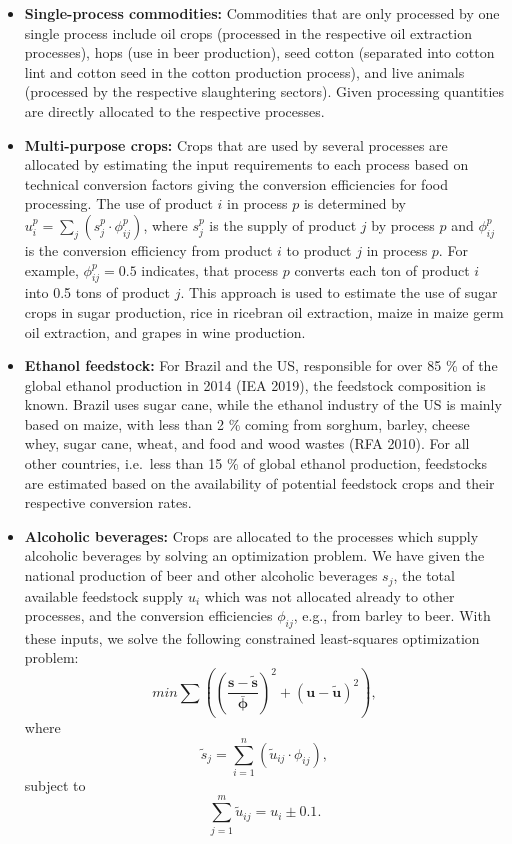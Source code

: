 \documentclass[]{article}
\begin{document}
\begin{itemize}
\item
  \textbf{Single-process commodities:} Commodities that are only
  processed by one single process include oil crops (processed in the
  respective oil extraction processes), hops (use in beer production),
  seed cotton (separated into cotton lint and cotton seed in the cotton
  production process), and live animals (processed by the respective
  slaughtering sectors). Given processing quantities are directly
  allocated to the respective processes.
\item
  \textbf{Multi-purpose crops:} Crops that are used by several processes
  are allocated by estimating the input requirements to each process
  based on technical conversion factors giving the conversion
  efficiencies for food processing. The use of product \(i\) in process
  \(p\) is determined by
  \(u_{i}^{p} = \sum_{j} (s_{j}^{p} \cdot \phi_{ij}^{p})\), where
  \(s_{j}^{p}\) is the supply of product \(j\) by process \(p\) and
  \(\phi_{ij}^{p}\) is the conversion efficiency from product \(i\) to
  product \(j\) in process \(p\). For example, \(\phi_{ij}^{p} = 0.5\)
  indicates, that process \(p\) converts each ton of product \(i\) into
  0.5 tons of product \(j\). This approach is used to estimate the use
  of sugar crops in sugar production, rice in ricebran oil extraction,
  maize in maize germ oil extraction, and grapes in wine production.
\item
  \textbf{Ethanol feedstock:} For Brazil and the US, responsible for
  over 85 \% of the global ethanol production in 2014 (IEA 2019), the
  feedstock composition is known. Brazil uses sugar cane, while the
  ethanol industry of the US is mainly based on maize, with less than 2
  \% coming from sorghum, barley, cheese whey, sugar cane, wheat, and
  food and wood wastes (RFA 2010). For all other countries, i.e.~less
  than 15 \% of global ethanol production, feedstocks are estimated
  based on the availability of potential feedstock crops and their
  respective conversion rates.
\item
  \textbf{Alcoholic beverages:} Crops are allocated to the processes
  which supply alcoholic beverages by solving an optimization problem.
  We have given the national production of beer and other alcoholic
  beverages \(s_{j}\), the total available feedstock supply \(u_{i}\)
  which was not allocated already to other processes, and the conversion
  efficiencies \(\phi_{ij}\), e.g., from barley to beer. With these
  inputs, we solve the following constrained least-squares optimization
  problem:
  \[min\sum \left(\left(\frac{\mathbf{s} - \mathbf{\tilde{s}}}{\mathbf{\bar{\phi}}}\right)^{2} + (\mathbf{u} - \mathbf{\tilde{u}})^{2}\right),\]
  where
  \[\tilde{s}_{j} = \sum_{i=1}^{n} \left(\tilde{u}_{ij} \cdot \phi_{ij}\right),\]
  subject to \[\sum_{j=1}^{m} \tilde{u}_{ij} = u_{i} \pm 0.1.\]
\end{itemize}
\end{document}
